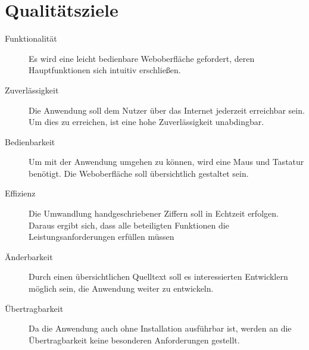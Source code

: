 \section{Qualitätsziele}

\begin{description}
\item[Funktionalität]
Es wird eine leicht bedienbare Weboberfläche gefordert, deren Hauptfunktionen sich intuitiv erschließen.
\item[Zuverlässigkeit]
Die Anwendung soll dem Nutzer über das Internet jederzeit erreichbar sein. Um dies zu erreichen, ist eine hohe Zuverlässigkeit unabdingbar.
\item[Bedienbarkeit]
Um mit der Anwendung umgehen zu können, wird eine Maus und Tastatur benötigt. Die Weboberfläche soll übersichtlich gestaltet sein.
\item[Effizienz]
Die Umwandlung handgeschriebener Ziffern soll in Echtzeit erfolgen. Daraus ergibt sich, dass alle beteiligten Funktionen die Leistungsanforderungen erfüllen müssen
\item[Änderbarkeit]
Durch einen übersichtlichen Quelltext soll es interessierten Entwicklern möglich sein, die Anwendung weiter zu entwickeln.
\item[Übertragbarkeit]
Da die Anwendung auch ohne Installation ausführbar ist, werden an die Übertragbarkeit keine besonderen Anforderungen gestellt.
\end{description}


